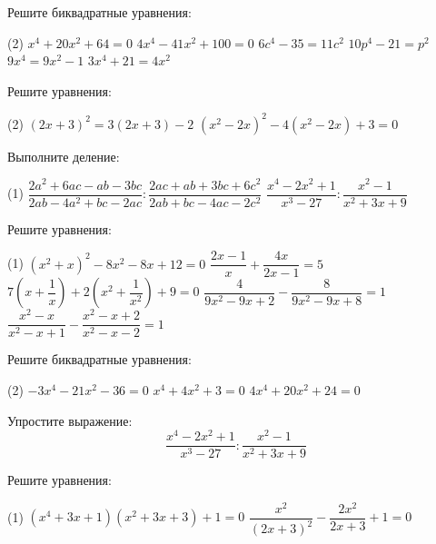 \begin{class}[number=4]
	\begin{listofex}
		\item Решите биквадратные уравнения:
		\begin{tasks}(2)
			\task \( x^4+20x^2+64=0 \)
			\task \( 4x^4-41x^2+100=0 \)
			\task \( 6c^4-35=11c^2 \)
			\task \( 10p^4-21=p^2 \)
			\task \( 9x^4=9x^2-1 \)
			\task \( 3x^4+21=4x^2 \)
		\end{tasks}
		\item Решите уравнения:
		\begin{tasks}(2)
			\task \( (2x+3)^2=3(2x+3)-2 \)
			\task \( (x^2-2x)^2-4(x^2-2x)+3=0 \)
		\end{tasks}
		\item Выполните деление:
		\begin{tasks}(1)
			\task \( \dfrac{2a^2+6ac-ab-3bc}{2ab-4a^2+bc-2ac}:\dfrac{2ac+ab+3bc+6c^2}{2ab+bc-4ac-2c^2} \)
			\task \( \dfrac{x^4-2x^2+1}{x^3-27}:\dfrac{x^2-1}{x^2+3x+9} \)
		\end{tasks}
	\end{listofex}
\end{class}

\begin{class}[number=5]
	\begin{listofex}
		\item Решите уравнения:
		\begin{tasks}(1)
			\task \( (x^2+x)^2-8x^2-8x+12=0 \)
			\task \( \dfrac{2x-1}{x}+\dfrac{4x}{2x-1}=5 \)
			\task \( 7\left( x+\dfrac{1}{x} \right)+2\left( x^2+\dfrac{1}{x^2} \right)+9=0 \)
			\task \( \dfrac{4}{9x^2-9x+2}-\dfrac{8}{9x^2-9x+8}=1 \)
			\task \( \dfrac{x^2-x}{x^2-x+1}-\dfrac{x^2-x+2}{x^2-x-2}=1 \)
		\end{tasks}
	\end{listofex}
\end{class}

\begin{homework}[number=2]
	\begin{listofex}
		\item Решите биквадратные уравнения:
		\begin{tasks}(2)
			\task \( -3x^4-21x^2-36=0 \)
			\task \( x^4+4x^2+3=0 \)
			\task \( 4x^4+20x^2+24=0 \)
		\end{tasks}
		\item Упростите выражение: \[ \dfrac{x^4-2x^2+1}{x^3-27}:\dfrac{x^2-1}{x^2+3x+9} \]
		\item Решите уравнения:
		\begin{tasks}(1)
			\task \( (x^4+3x+1)(x^2+3x+3)+1=0 \)
			\task \( \dfrac{x^2}{(2x+3)^2}-\dfrac{2x^2}{2x+3}+1=0 \)
		\end{tasks}
	\end{listofex}
\end{homework}

